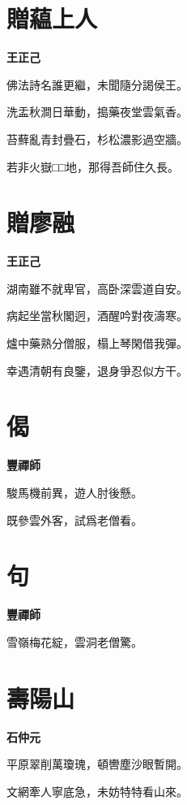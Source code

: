 \documentclass[12pt,a4paper]{ctexbook}
\begin{document}
\section{贈藴上人}
\textbf{王正己}\par\vspace{0.5em}
佛法詩名誰更繼，未聞隨分謁侯王。\par
洗盂秋澗日華動，搗藥夜堂雲氣香。\par
苔蘚亂青封疊石，杉松濃影過空牆。\par
若非火嶽□□地，那得吾師住久長。\par

\section{贈廖融}
\textbf{王正己}\par\vspace{0.5em}
湖南雖不就卑官，高卧深雲道自安。\par
病起坐當秋閣迥，酒醒吟對夜濤寒。\par
爐中藥熟分僧服，榻上琴閑借我彈。\par
幸遇清朝有良鑒，退身爭忍似方干。\par

\section{偈}
\textbf{豐禪師}\par\vspace{0.5em}
駿馬機前異，遊人肘後懸。\par
既參雲外客，試爲老僧看。\par

\section{句}
\textbf{豐禪師}\par\vspace{0.5em}
雪嶺梅花綻，雲洞老僧驚。\par

\section{壽陽山}
\textbf{石仲元}\par\vspace{0.5em}
平原翠削萬瓊瑰，頓轡塵沙眼暫開。\par
文網牽人寧底急，未妨特特看山來。\par
\end{document}
